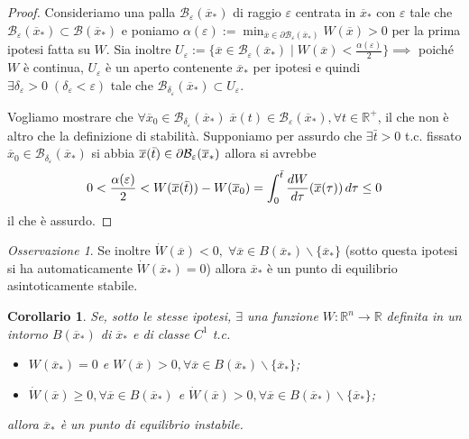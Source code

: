 \documentclass{book}
\theoremstyle{plain}
\theoremstyle{plain}
\theoremstyle{plain}
\theoremstyle{plain}
\newtheorem*{cor}{Corollario}
\theoremstyle{plain}
\theoremstyle{definition}
\theoremstyle{remark}
\newtheorem*{oss}{Osservazione}
\theoremstyle{definition}
\begin{document}
\begin{proof}
    Consideriamo una palla $\mathcal{B}_{\varepsilon}(\overline{x}_*)$ di raggio $\varepsilon$ centrata in $\overline{x}_*$ con $\varepsilon$ tale che $\mathcal{B}_{\varepsilon}(\overline{x}_*)\subset\mathcal{B}(\overline{x}_*)$ e poniamo $\alpha(\varepsilon):=\min_{\overline{x}\in\partial\mathcal{B}_{\varepsilon}(\overline{x}_*)}W(\overline{x})>0$ per la prima ipotesi fatta su $W$. Sia inoltre $U_{\varepsilon}:=\{\overline{x}\in\mathcal{B}_{\varepsilon}(\overline{x}_*)\;|\;W(\overline{x})<\frac{\alpha(\varepsilon)}{2}\}\implies$ poiché $W$ è continua, $U_{\varepsilon}$ è un aperto contenente $\overline{x}_*$ per ipotesi e quindi $\exists \delta_{\varepsilon}>0 \;(\delta_{\varepsilon}<\varepsilon)$ tale che $\mathcal{B}_{\delta_{\varepsilon}}(\overline{x}_*)\subset U_{\varepsilon}$.

    \noindent Vogliamo mostrare che $\forall \overline{x}_0\in\mathcal{B}_{\delta_{\varepsilon}}(\overline{x}_*) \;\overline{x}(t)\in\mathcal{B}_{\varepsilon}(\overline{x}_*), \forall t\in\mathbb{R}^+$, il che non è altro che la definizione di stabilità. Supponiamo per assurdo che $\exists \bar{t}>0$ t.c. fissato $\overline{x}_0\in\mathcal{B}_{\delta_{\varepsilon}}(\overline{x}_*)$ si abbia $\overline{x}(\Bar{t})\in\partial\mathcal{B}_{\varepsilon}(\overline{x}_*)$ allora si avrebbe
    \begin{displaymath}
        0<\frac{\alpha(\varepsilon)}{2}<W(\overline{x}(\Bar{t}))-W(\overline{x}_0)=\int_0^{\Bar{t}}\frac{dW}{d\tau}(\overline{x}(\tau))\,d\tau\leq 0
    \end{displaymath}
    il che è assurdo.
\end{proof}

\begin{oss}
    Se inoltre $\dot{W}(\overline{x})<0, \; \forall \overline{x}\in B(\overline{x}_*)\backslash\{\overline{x}_*\}$ (sotto questa ipotesi si ha automaticamente $\dot{W}(\overline{x}_*)=0$) allora $\overline{x}_*$ è un punto di equilibrio asintoticamente stabile.
\end{oss}

\begin{cor}
    Se, sotto le stesse ipotesi, $\exists$ una funzione  $W:\mathbb{R}^n\to\mathbb{R}$ definita in un intorno $B(\overline{x}_*)$ di $\overline{x}_*$ e di classe $C^1$ t.c.
    \begin{itemize}
        \item $W(\overline{x}_*)=0$ e $W(\overline{x})>0, \forall \overline{x} \in B(\overline{x}_*)\backslash\{\overline{x}_*\}$;
        \item $\dot{W}(\overline{x})\ge 0, \forall \overline{x} \in B(\overline{x}_*)$ e $\dot{W}(\overline{x})>0, \forall \overline{x} \in B(\overline{x}_*)\backslash\{\overline{x}_*\}$;
    \end{itemize}
    allora $\overline{x}_*$ è un punto di equilibrio instabile.
\end{cor}
\end{document}
